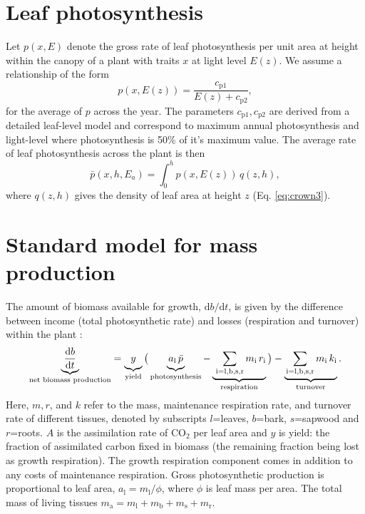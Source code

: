 \documentclass[10pt,twoside]{article}
\begin{document}
\section{Leaf photosynthesis}\label{leaf-photosynthesis}

Let \(p(x,E)\) denote the gross rate of leaf photosynthesis per unit
area at height within the canopy of a plant with traits \(x\) at light
level \(E(z)\). We assume a relationship of the form
\begin{equation}\label{eq:photosynthesis}
p(x,E(z))=\frac{c_\textrm{p1}}{E(z)+c_\textrm{p2}},
\end{equation}
for the average of \(p\) across the year. The parameters
\(c_\textrm{p1}, c_\textrm{p2}\) are derived from a detailed leaf-level 
model and correspond to maximum annual photosynthesis and light-level
where photosynthesis is 50\% of it's maximum value. The average rate of 
leaf photosynthesis across the plant is then
\begin{equation}\label{eq:photosynthesis_av}
\bar{p}(x,h,E_a)=\int_0^h p(x,E(z)) \, q(z, h),
\end{equation}
where \(q(z, h)\) gives the density of leaf area at height \(z\) (Eq.
\ref{eq:crown3}).

\section{Standard model for mass
production}\label{standard-model-for-mass-production}

The amount of biomass available for growth,
\(\textrm{d}b / \textrm{d}t\), is given by the difference between income
(total photosynthetic rate) and losses (respiration and turnover) within the
plant \citep{Makela-1997, Thornley-2000, Falster-2011}:
\begin{equation}\label{eq:dbdt}
\underbrace{\strut \frac{\textrm{d}b}{\textrm{d}t}}_\textrm{net biomass production}
  = \underbrace{\strut y}_\textrm{yield}
    \big( \underbrace{\strut a_\textrm{l} \, \bar{p}}_\textrm{photosynthesis} -
     \underbrace{\strut \,\sum_\textrm{i=l,b,s,r}{m_\textrm{i} \, r_\textrm{i}}}_\textrm{respiration}\big)
    - \underbrace{\strut \sum_\textrm{i=l,b,s,r}{m_\textrm{i} \, k_\textrm{i}}}_\textrm{turnover}.
\end{equation}
Here, \(m,r\), and \(k\) refer to the mass, maintenance respiration rate, and
turnover rate of different tissues, denoted by subscripts \(l\)=leaves,
\(b\)=bark, \(s\)=sapwood and \(r\)=roots. \(A\) is the assimilation
rate of CO\(_2\) per leaf area and \(y\) is yield: the fraction of
assimilated carbon fixed in biomass (the remaining fraction being lost
as growth respiration). The growth respiration component comes in addition
to any costs of maintenance respiration. Gross photosynthetic production is proportional to leaf area,
\(a_\textrm{l} = m_\textrm{l} / \phi\), where \(\phi\) is leaf mass per
area. The total mass of living tissues
\(m_\textrm{a}=m_\textrm{l}+m_\textrm{b}+m_\textrm{s}+m_\textrm{r}.\)
\end{document}
